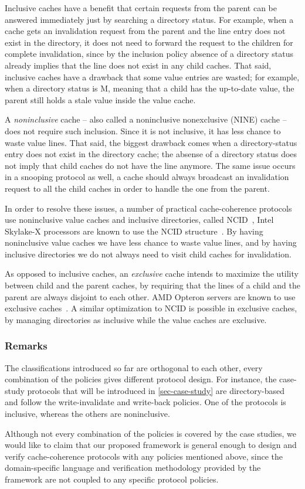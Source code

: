Inclusive caches have a benefit that certain requests from the parent can be answered immediately just by searching a directory status.
For example, when a cache gets an invalidation request from the parent and the line entry does not exist in the directory, it does not need to forward the request to the children for complete invalidation, since by the inclusion policy absence of a directory status already implies that the line does not exist in any child caches.
That said, inclusive caches have a drawback that some value entries are wasted; for example, when a directory status is M, meaning that a child has the up-to-date value, the parent still holds a stale value inside the value cache.

A \emph{noninclusive} cache -- also called a noninclusive nonexclusive (NINE) cache -- does not require such inclusion.
Since it is not inclusive, it has less chance to waste value lines.
That said, the biggest drawback comes when a directory-status entry does not exist in the directory cache; the absense of a directory status does not imply that child caches do not have the line anymore.
The same issue occurs in a snooping protocol as well, \eg{} a cache should always broadcast an invalidation request to all the child caches in order to handle the one from the parent.

In order to resolve these issues, a number of practical cache-coherence protocols use noninclusive value caches and inclusive directories, called NCID~\cite{Zhao:2010}, \eg{} Intel Skylake-X processors are known to use the NCID structure~\cite{intel-non-inclusive,Yan:2019}.
By having noninclusive value caches we have less chance to waste value lines, and by having inclusive directories we do not always need to visit child caches for invalidation.

As opposed to inclusive caches, an \emph{exclusive} cache intends to maximize the utility between child and the parent caches, by requiring that the lines of a child and the parent are always disjoint to each other.
AMD Opteron servers are known to use exclusive caches~\cite{Irazoqui:2016}.
A similar optimization to NCID is possible in exclusive caches, by managing directories as inclusive while the value caches are exclusive.

\subsubsection{Remarks}

The classifications introduced so far are orthogonal to each other, \ie{} every combination of the policies gives different protocol design.
For instance, the case-study protocols that will be introduced in \autoref{sec-case-study} are directory-based and follow the write-invalidate and write-back policies.
One of the protocols is inclusive, whereas the others are noninclusive.

Although not every combination of the policies is covered by the case studies, we would like to claim that our proposed framework \hemiola{} is general enough to design and verify cache-coherence protocols with any policies mentioned above, since the domain-specific language and verification methodology provided by the framework are not coupled to any specific protocol policies.

